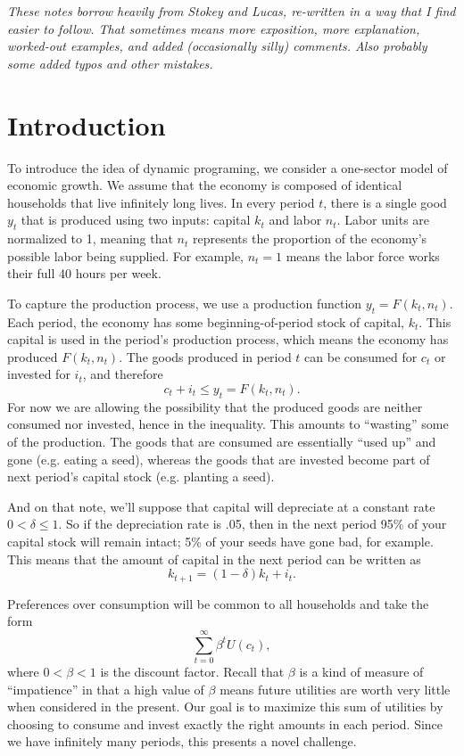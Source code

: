 \documentclass[12pt]{article}
\theoremstyle{definition}
\begin{document}
\maketitle
\singlespace

\noindent \emph{These notes borrow heavily from Stokey and Lucas, re-written in a way that I find easier to follow. That sometimes means more exposition, more explanation, worked-out examples, and added (occasionally silly) comments. Also probably some added typos and other mistakes. }



\section{Introduction}

To introduce the idea of dynamic programing, we consider a one-sector model of economic growth. We assume that the economy is composed of identical households that live infinitely long lives. In every period $t$, there is a single good $y_t$ that is produced using two inputs: capital $k_t$ and labor $n_t$. Labor units are normalized to 1, meaning that $n_t$ represents the proportion of the economy's possible labor being supplied. For example, $n_t=1$ means the labor force works their full 40 hours per week.

To capture the production process, we use a production function $y_t=F(k_t, n_t)$. Each period, the economy has some beginning-of-period stock of capital, $k_t$. This capital is used in the period's production process, which means the economy has produced $F(k_t, n_t)$. The goods produced in period $t$ can be consumed for $c_t$ or invested for $i_t$, and therefore
	\[c_t + i_t \leq y_t = F(k_t, n_t).	\]
For now we are allowing the possibility that the produced goods are neither consumed nor invested, hence in the inequality. This amounts to ``wasting''  some of the production. The goods that are consumed are essentially ``used up'' and gone (e.g. eating a seed), whereas the goods that are invested become part of next period's capital stock (e.g. planting a seed). 

And on that note, we'll suppose that capital will depreciate at a constant rate $0 < \delta \leq 1$. So if the depreciation rate is .05, then in the next period 95\% of your capital stock will remain intact; 5\% of your seeds have gone bad, for example. This means that the amount of capital in the next period can be written as
	\[ k_{t+1} = (1 - \delta)k_t + i_t.\]

Preferences over consumption will be common to all households and take the form
	\[	\sum_{t=0}^{\infty} \beta^t U(c_t),\]
where $0 < \beta < 1$ is the discount factor. Recall that $\beta$ is a kind of measure of ``impatience'' in that a high value of $\beta$ means future utilities are worth very little when considered in the present. Our goal is to maximize this sum of utilities by choosing to consume and invest exactly the right amounts in each period. Since we have infinitely many periods, this presents a novel challenge. 
\end{document}
